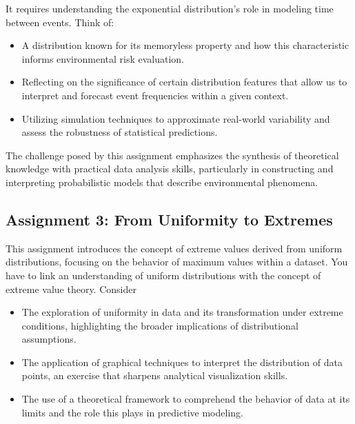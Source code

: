 It requires understanding the exponential distribution's role in modeling time between events. Think of:

\begin{itemize}
    \item A distribution known for its memoryless property and how this characteristic informs environmental risk evaluation.
    \item Reflecting on the significance of certain distribution features that allow us to interpret and forecast event frequencies within a given context.
    \item Utilizing simulation techniques to approximate real-world variability and assess the robustness of statistical predictions.
\end{itemize}

The challenge posed by this assignment emphasizes the synthesis of theoretical knowledge with practical data analysis skills, particularly in constructing and interpreting probabilistic models that describe environmental phenomena.

\subsection*{Assignment 3: From Uniformity to Extremes}
This assignment introduces the concept of extreme values derived from uniform distributions, focusing on the behavior of maximum values within a dataset. You have to link an understanding of uniform distributions with the concept of extreme value theory. Consider

\begin{itemize}
    \item The exploration of uniformity in data and its transformation under extreme conditions, highlighting the broader implications of distributional assumptions.
    \item The application of graphical techniques to interpret the distribution of data points, an exercise that sharpens analytical visualization skills.
    \item The use of a theoretical framework to comprehend the behavior of data at its limits and the role this plays in predictive modeling.
\end{itemize}
